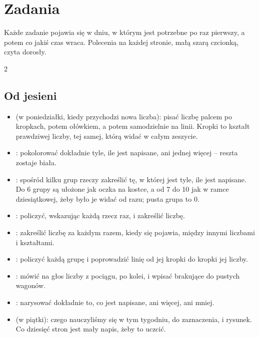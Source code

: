 \section*{Zadania}

Każde zadanie pojawia się w dniu, w którym jest potrzebne po raz
pierwszy, a potem co jakiś czas wraca. Polecenia na każdej stronie, małą
szarą czcionką, czyta dorosły.

{\small
\begin{multicols}{2}
\raggedright
\subsection*{Od jesieni}
\begin{itemize}[leftmargin=5mm, itemsep=1pt, topsep=0pt]
\item \textbf{\lblTraza} (w poniedziałki, kiedy przychodzi nowa liczba):
  pisać liczbę palcem po kropkach, potem ołówkiem, a potem samodzielnie
  na linii. Kropki to kształt prawdziwej liczby, tej samej, którą widać
  w całym zeszycie.
\item \textbf{\lblColorea}: pokolorować dokładnie tyle, ile jest
  napisane, ani jednej więcej -- reszta zostaje biała.
\item \textbf{\lblRodea}: spośród kilku grup rzeczy zakreślić tę, w
  której jest tyle, ile jest napisane. Do 6 grupy są ułożone jak oczka na
  kostce, a od 7 do 10 jak w ramce dziesiątkowej, żeby było je widać od
  razu; pusta grupa to 0.
\item \textbf{\lblCuenta}: policzyć, wskazując każdą rzecz raz, i
  zakreślić liczbę.
\item \textbf{\lblBusca}: zakreślić liczbę za każdym razem, kiedy się
  pojawia, między innymi liczbami i kształtami.
\item \textbf{\lblUne}: policzyć każdą grupę i poprowadzić linię od jej
  kropki do kropki jej liczby.
\item \textbf{\lblCompleta}: mówić na głos liczby z pociągu, po kolei, i
  wpisać brakujące do pustych wagonów.
\item \textbf{\lblDibuja}: narysować dokładnie to, co jest napisane, ani
  więcej, ani mniej.
\item \textbf{\lblRepasa} (w piątki): czego nauczyliśmy się w tym
  tygodniu, do zaznaczenia, i rysunek. Co dziesięć stron jest mały napis,
  żeby to uczcić.
\end{itemize}


\end{multicols}}
